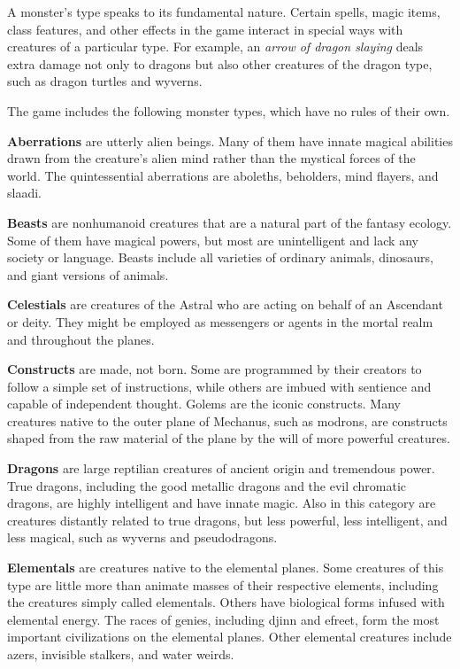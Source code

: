 A monster's type speaks to its fundamental nature. Certain spells, magic items, class features, and other effects in the game interact in special ways with creatures of a particular type. For example, an \textit{arrow of dragon slaying} deals extra damage not only to dragons but also other creatures of the dragon type, such as dragon turtles and wyverns.

The game includes the following monster types, which have no rules of their own.

\textbf*{Aberrations} are utterly alien beings. Many of them have innate magical abilities drawn from the creature's alien mind rather than the mystical forces of the world. The quintessential aberrations are aboleths, beholders, mind flayers, and slaadi.

\textbf*{Beasts} are nonhumanoid creatures that are a natural part of the fantasy ecology. Some of them have magical powers, but most are unintelligent and lack any society or language. Beasts include all varieties of ordinary animals, dinosaurs, and giant versions of animals.

\textbf*{Celestials} are creatures of the Astral who are acting on behalf of an Ascendant or deity. They might be employed as messengers or agents in the mortal realm and throughout the planes.

\textbf*{Constructs} are made, not born. Some are programmed by their creators to follow a simple set of instructions, while others are imbued with sentience and capable of independent thought. Golems are the iconic constructs. Many creatures native to the outer plane of Mechanus, such as modrons, are constructs shaped from the raw material of the plane by the will of more powerful creatures.

\textbf*{Dragons} are large reptilian creatures of ancient origin and tremendous power. True dragons, including the good metallic dragons and the evil chromatic dragons, are highly intelligent and have innate magic. Also in this category are creatures distantly related to true dragons, but less powerful, less intelligent, and less magical, such as wyverns and pseudodragons.

\textbf*{Elementals} are creatures native to the elemental planes. Some creatures of this type are little more than animate masses of their respective elements, including the creatures simply called elementals. Others have biological forms infused with elemental energy. The races of genies, including djinn and efreet, form the most important civilizations on the elemental planes. Other elemental creatures include azers, invisible stalkers, and water weirds.

